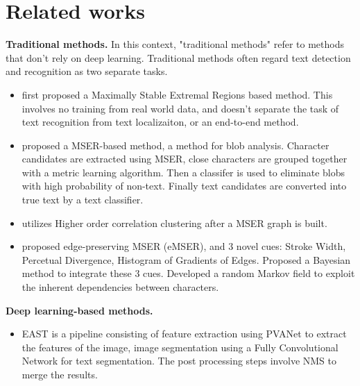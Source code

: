\documentclass[conference]{IEEEtran}
\begin{document}
\section{Related works}

\textbf{Traditional methods.} In this context, "traditional methods" refer to methods that don't rely on deep learning. Traditional methods often regard text detection and recognition as two separate tasks.

\begin{itemize}
    \item \cite{Neumann_Matas_2011} first proposed a Maximally Stable Extremal Regions \cite{Matas_Chum_Urban_Pajdla} based method. This involves no training from real world data, and doesn't separate the task of text recognition from text localizaiton, or an end-to-end method.
    \item \cite{Yin_Yin_Huang_Hao_2014} proposed a MSER-based method, a method for blob analysis. Character candidates are extracted using MSER, close characters are grouped together with a metric learning algorithm. Then a classifer is used to eliminate blobs with high probability of non-text. Finally text candidates are converted into true text by a text classifier.
    \item \cite{Kang_Li_Doermann_2014}  utilizes Higher order correlation clustering \cite{Kim_Nowozin_Kohli_Yoo} after a MSER graph is built.
    \item \cite{Li_Jia_Shen_Hengel_2013} proposed edge-preserving  MSER (eMSER), and 3 novel cues: Stroke Width, Percetual Divergence, Histogram of Gradients of Edges. Proposed a Bayesian method to integrate these 3 cues. Developed a random Markov field to exploit the inherent dependencies between characters.
    
\end{itemize}

\textbf{Deep learning-based methods.} 

\begin{itemize}
    \item EAST \cite{Zhou_Yao_Wen_Wang_Zhou_He_Liang_2017} is a pipeline consisting of  feature extraction using PVANet \cite{Kim_Hong_Roh_Cheon_Park_2016} to extract the features of the image, image segmentation using a Fully Convolutional Network \cite{Long_Shelhamer_Darrell_2015} for text segmentation. The post processing steps involve NMS to merge the results.

\end{itemize}





\end{document}
